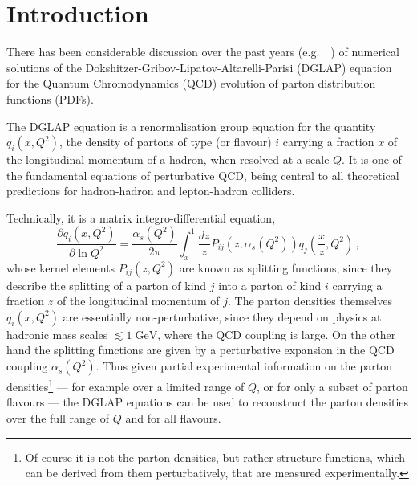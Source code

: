 \documentclass[12pt]{article}
\newcommand{\lp}{\left(}
\newcommand{\rp}{\right)}
\newcommand{\aq}{\alpha_s\left( Q^2 \right)}
\newcommand{\GeV}{\;\mathrm{GeV}}
\newcommand{\as}{\alpha_s}
\newcommand{\eg}{e.g.\ }
\newcommand{\AllDGLAP}{Botje,Schoeffel:1998tz,Pegasus,Pascaud:2001bi,Weinzierl:2002mv,coriano,GuzziThesis,nnpdf,Kosower:1997hg,Ratcliffe:2000kp}
\begin{document}
\newpage
\tableofcontents


\section{Introduction}
\label{sec:intro}

There has been considerable discussion over the past years
(\eg~\cite{\AllDGLAP}) of numerical solutions of the 
Dokshitzer-Gribov-Lipatov-Altarelli-Parisi (DGLAP)
 equation~\cite{DGLAP} for the Quantum Chromodynamics
(QCD)
evolution  of parton distribution functions (PDFs).


The DGLAP equation
\cite{DGLAP} is a renormalisation group equation for the quantity
$q_i(x,Q^2)$, the density of partons of type (or flavour) $i$ carrying
a fraction $x$ of the longitudinal momentum of a hadron, when resolved
at a scale $Q$. It is one of the fundamental equations of perturbative
QCD, being central to all theoretical
predictions for hadron-hadron and lepton-hadron colliders.

Technically, it is a matrix integro-differential equation,
\begin{equation}
  \label{eq:dglap}
  \frac{\partial q_i(x,Q^2)}{\partial \ln Q^2} = \frac{\aq}{2\pi}
 \int_x^1 \frac{dz}{z}
  P_{ij}\lp z,\aq\rp q_j\lp \frac{x}{z},Q^2\rp\,,
\end{equation}
whose kernel elements $P_{ij}(z,Q^2)$ are known as splitting
functions, since they describe the splitting of a parton of kind $j$
into a parton of kind $i$ carrying a fraction $z$ of the longitudinal
momentum of $j$. The parton densities themselves $q_i(x,Q^2)$ are
essentially non-perturbative, since they depend on physics at hadronic
mass scales $\lesssim 1 \GeV$, where the QCD coupling is large. On the
other hand the splitting functions are given by a perturbative
expansion in the QCD coupling $\as(Q^2)$. Thus given partial
experimental information on the parton densities\footnote{Of course it
  is not the parton densities, but rather structure functions, which
  can be derived from them perturbatively, that are measured
  experimentally.} %
--- for example over a limited range of $Q$, or for only a subset of
parton flavours --- the DGLAP equations can be used to reconstruct the
parton densities over the full range of $Q$ and for all flavours.
\end{document}
